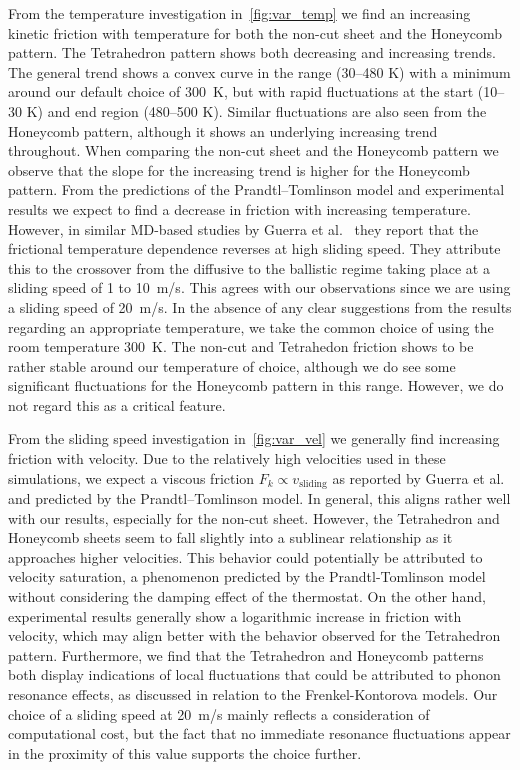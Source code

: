 From the temperature investigation in~\cref{fig:var_temp} we find an increasing
kinetic friction with temperature for both the non-cut sheet and the Honeycomb
pattern. The Tetrahedron pattern shows both decreasing and increasing trends.
The general trend shows a convex curve in the range (30--480 K) with a minimum
around our default choice of \SI{300}{K}, but with rapid fluctuations at the
start (10--30 K) and end region (480--500 K). Similar fluctuations are also seen
from the Honeycomb pattern, although it shows an underlying increasing trend
throughout. When comparing the non-cut sheet and the Honeycomb pattern we
observe that the slope for the increasing trend is higher for the Honeycomb
pattern. From the predictions of the Prandtl–Tomlinson model and experimental results we expect to find a decrease in friction with increasing temperature. However, in similar \acrshort{MD}-based studies by Guerra et al.~\cite{Guerra_2010} they report that the frictional temperature dependence reverses at high sliding speed. They attribute this to the crossover from the diffusive to the ballistic regime taking place at a sliding speed of 1 to \SI{10}{m/s}. This agrees with our observations since we are using a sliding speed of \SI{20}{m/s}. In the absence of any clear suggestions from the results regarding an appropriate temperature, we take the common choice of using the room temperature \SI{300}{K}. The non-cut and Tetrahedon friction shows to be rather
stable around our temperature of choice, although we do see some significant fluctuations for the Honeycomb pattern in this range. However, we do not regard this as a critical feature.

From the sliding speed investigation in~\cref{fig:var_vel} we generally find
increasing friction with velocity. Due to the relatively high velocities used in
these simulations, we expect a viscous friction $F_k \propto v_{\text{sliding}}$
as reported by Guerra et al.~\cite{Guerra_2010} and predicted by the
Prandtl–Tomlinson model. In general, this aligns rather well with our results,
especially for the non-cut sheet. However, the Tetrahedron and Honeycomb sheets
seem to fall slightly into a sublinear relationship as it approaches higher
velocities. This behavior could potentially be attributed to velocity
saturation, a phenomenon predicted by the Prandtl-Tomlinson model without
considering the damping effect of the thermostat. On the other hand,
experimental results generally show a logarithmic increase in friction with
velocity, which may align better with the behavior observed for the Tetrahedron
pattern. Furthermore, we find that the Tetrahedron and Honeycomb patterns both
display indications of local fluctuations that could be attributed
to phonon resonance effects, as discussed in relation to the Frenkel-Kontorova
models. Our choice of a sliding speed at \SI{20}{m/s} mainly reflects a
consideration of computational cost, but the fact that no immediate resonance
fluctuations appear in the proximity of this value supports the choice further.  


